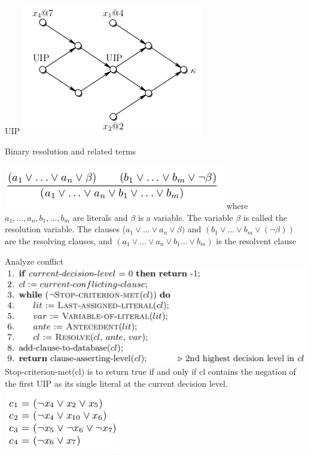 \documentclass{beamer}
\begin{document}
\begin{frame}{UIP}
\includegraphics[scale=0.4]{UIP.png}
\begin{block}{Binary resolution and related terms}
\end{block}
\includegraphics[scale=0.5]{Binary_resolution.png}
where $a_1, \dots, a_n, b_1, \dots, b_m$ are literals and $\beta$ is a variable. The variable $\beta$ is called the resolution variable. The clauses ($a_1 \vee \dots \vee a_n \vee \beta)$ and $(b_1 \vee \dots \vee b_m \vee (\lnot\beta))$ are the resolving clauses, and $(a_1 \vee \dots \vee a_n \vee b_1 \dots \vee b_m)$ is the resolvent clause
\end{frame}

\begin{frame}{Analyze conflict}
\includegraphics[scale=0.25]{Analyze-Conflict.png}\newline
Stop-criterion-met(cl) is to return true if and only if cl contains the negation of the first UIP as its single literal at the current decision level.\newline
\includegraphics[scale=0.5]{UIP1.png}
\end{frame}
\end{document}
